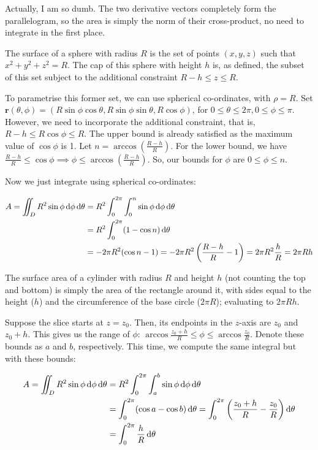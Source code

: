 Actually, I am so dumb. The two derivative vectors completely form the parallelogram, so the area is simply the norm of their cross-product, no need to integrate in the first place.


The surface of a sphere with radius $R$ is the set of points $(x, y, z)$ such that $x^2 + y^2 + z^2 = R$. The cap of this sphere with height $h$ is, as defined, the subset of this set subject to the additional constraint $R - h \leq z \leq R$.

To parametrise this former set, we can use spherical co-ordinates, with $\rho = R$. Set $\mathbf{r}(\theta, \phi) = (R \sin\phi \cos\theta, R \sin\phi \sin\theta, R \cos\phi)$, for $0 \leq \theta \leq 2\pi, 0 \leq \phi \leq \pi$. However, we need to incorporate the additional constraint, that is, $R - h \leq R \cos\phi \leq R$. The upper bound is already satisfied as the maximum value of $\cos\phi$ is 1. Let $n = \arccos\left(\frac{R - h}{R}\right)$. For the lower bound, we have $\frac{R - h}{R} \leq \cos\phi \implies \phi \leq \arccos \left(\frac{R - h}{R}\right)$. So, our bounds for $\phi$ are $0 \leq \phi \leq n$.

Now we just integrate using spherical co-ordinates:

\begin{align*}
  A = \iint_D R^2 \sin\phi \mathop{}\!\mathrm{d} \phi \mathop{}\!\mathrm{d} \theta &= R^2 \int_0^{2\pi} \int_0^n \sin\phi \mathop{}\!\mathrm{d} \phi \mathop{}\!\mathrm{d} \theta \\
  &= R^2 \int_0^{2\pi} (1 - \cos n) \mathop{}\!\mathrm{d} \theta \\
  &= -2\pi R^2 (\cos n - 1) = -2\pi R^2 \left(\frac{R - h}{R} - 1\right) = 2\pi R^2 \frac{h}{R} = 2\pi Rh
\end{align*}

The surface area of a cylinder with radius $R$ and height $h$ (not counting the top and bottom) is simply the area of the rectangle around it, with sides equal to the height ($h$) and the circumference of the base circle ($2\pi R$); evaluating to $2\pi Rh$.

Suppose the slice starts at $z = z_0$. Then, its endpoints in the $z$-axis are $z_0$ and $z_0 + h$. This gives us the range of $\phi$: $\arccos \frac{z_0 + h}{R} \leq \phi \leq \arccos \frac{z_0}{R}$. Denote these bounds as $a$ and $b$, respectively. This time, we compute the same integral but with these bounds:

\begin{align*}
  A = \iint_D R^2 \sin\phi \mathop{}\!\mathrm{d} \phi \mathop{}\!\mathrm{d} \theta &= R^2 \int_0^{2\pi} \int_a^b \sin\phi \mathop{}\!\mathrm{d} \phi \mathop{}\!\mathrm{d} \theta \\
  &= \int_0^{2\pi} (\cos a - \cos b) \mathop{}\!\mathrm{d} \theta = \int_0^{2\pi} \left(\frac{z_0 + h}{R} - \frac{z_0}{R}\right) \mathop{}\!\mathrm{d} \theta \\
  &= \int_0^{2\pi} \frac{h}{R} \mathop{}\!\mathrm{d} \theta
\end{align*}

